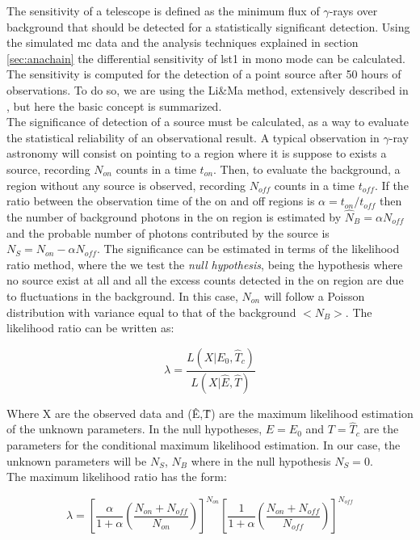 \documentclass[main.tex]{subfiles}
\begin{document}
The sensitivity of a telescope is defined as the minimum flux of $\gamma$-rays over background that should be detected for a statistically significant detection. Using the simulated \gls{mc} data and the analysis techniques explained in section \ref{sec:anachain} the differential sensitivity of \gls{lst}1 in mono mode can be calculated.\\
The sensitivity is computed for the detection of a point source after 50 hours of observations. To do so, we are using the Li\&Ma method, extensively described in \cite{1983LiMa}, but here the basic concept is summarized.\\
The significance of detection of a source must be calculated, as a way to evaluate the statistical reliability of an observational result. A typical observation in $\gamma$-ray astronomy will consist on pointing to a region where it is suppose to exists a source, recording $N_{on}$ counts in a time $t_{on}$. Then, to evaluate the background, a region without any source is observed, recording $N_{off}$ counts in a time $t_{off}$. If the ratio between the observation time of the on and off regions is $\alpha = t_{on}/t_{off}$ then the number of background photons in the on region is estimated by $\hat{N}_{B} = \alpha N_{off}$  and the probable number of photons contributed by the source is $N_{S} = N_{on}-\alpha N_{off}$. The significance can be estimated in terms of the likelihood ratio method, where the we test the \textit{null hypothesis}, being the hypothesis where no source exist at all and all the excess counts detected in the on region are due to fluctuations in the background. In this case, $N_{on}$ will follow a Poisson distribution with variance equal to that of the background $<N_{B}>$. The likelihood ratio can be written as:

\begin{equation}
  \lambda = \frac{L(X | E_{0}, \hat{T}_{c})}{L(X|\hat{E},\hat{T})}
\end{equation}

Where X are the observed data and (\^{E},\^{T}) are the maximum likelihood estimation of the unknown parameters. In the null hypotheses, $E=E_{0}$ and $T=\hat{T}_{c}$ are the parameters for the conditional maximum likelihood estimation. In our case, the unknown parameters will be $N_{S}$, $N_{B}$ where in the null hypothesis $N_{S}=0$.\\
The maximum likelihood ratio has the form:

\begin{equation}
  \lambda = \left[ \frac{\alpha}{1+\alpha}\left( \frac{N_{on}+N_{off}}{N_{on}}\right) \right]^{N_{on}} \left[ \frac{1}{1+\alpha}\left( \frac{N_{on}+N_{off}}{N_{off}}\right)\right]^{N_{off}}
\end{equation}
\end{document}

